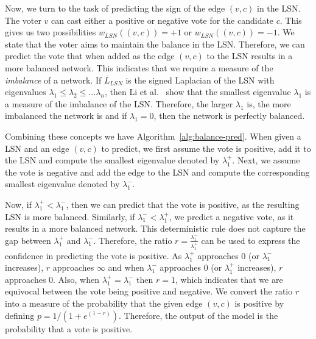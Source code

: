 Now, we turn to the task of predicting the sign of the edge $(v,c)$ in the LSN.
The voter $v$ can cast either a positive or negative vote for the candidate $c$.
This gives us two possibilities $w_{LSN}((v,c))=+1$ or $w_{LSN}((v,c))=-1$.
We state that the voter aims to maintain the balance in the LSN.
Therefore, we can predict the vote that when added as the edge $(v,c)$ to the LSN results in a more balanced network.
This indicates that we require a measure of the \textit{imbalance} of a network.
If $\overline{L}_{LSN}$ is the signed Laplacian of the LSN with eigenvalues $\lambda_1\leq\lambda_2\leq\dots\lambda_n$, then Li et al.\ \cite{li2016note} show that the smallest eigenvalue $\lambda_1$ is a measure of the imbalance of the LSN.
Therefore, the larger $\lambda_1$ is, the more imbalanced the network is and if $\lambda_1=0$, then the network is perfectly balanced. 
 
Combining these concepts we have Algorithm~\ref{alg:balance-pred}.
When given a LSN and an edge $(v,c)$ to predict, we first assume the vote is positive, add it to the LSN and compute the smallest eigenvalue denoted by $\lambda_1^{+}$.
Next, we assume the vote is negative and add the edge to the LSN and compute the corresponding smallest eigenvalue denoted by $\lambda_1^-$.

Now, if $\lambda_1^+ < \lambda_1^-$, then we can predict that the vote is positive, as the resulting LSN is more balanced.
Similarly, if $\lambda_1^-<\lambda_1^+$, we predict a negative vote, as it results in a more balanced network.
This deterministic rule does not capture the gap between $\lambda_1^+$ and $\lambda_1^-$.
Therefore, the ratio $r=\frac{\lambda_1^-}{\lambda_1^+}$ can be used to express the confidence in predicting the vote is positive.
As $\lambda_1^+$ approaches $0$ (or $\lambda_1^-$ increases), $r$ approaches $\infty$ and when $\lambda_1^-$ approaches $0$ (or $\lambda_1^+$ increases), $r$ approaches $0$.
Also, when $\lambda_1^+=\lambda_1^-$ then $r=1$, which indicates that we are equivocal between the vote being positive and negative.
We convert the ratio $r$ into a measure of the probability that the given edge $(v,c)$ is positive by defining $p=1/(1+e^{(1-r)})$.
Therefore, the output of the model is the probability that a vote is positive.


